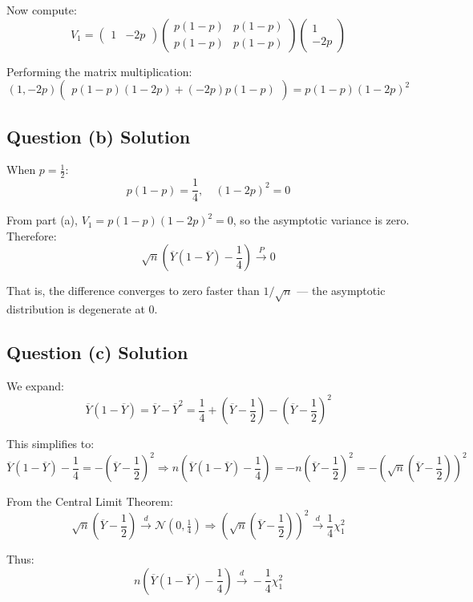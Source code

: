 \documentclass{article}
\begin{document}
Now compute:
\[
V_1 = 
\begin{pmatrix}
1 & -2p
\end{pmatrix}
\begin{pmatrix}
p(1 - p) & p(1 - p) \\
p(1 - p) & p(1 - p)
\end{pmatrix}
\begin{pmatrix}
1 \\
-2p
\end{pmatrix}
\]

Performing the matrix multiplication:
\[
(1, -2p)
\begin{pmatrix}
p(1 - p)(1 - 2p) + (-2p)p(1 - p)
\end{pmatrix}
= p(1 - p)(1 - 2p)^2
\]

\subsection{Question (b) Solution}
When $p = \frac{1}{2}$:
\[
p(1 - p) = \frac{1}{4}, \quad (1 - 2p)^2 = 0
\]

From part (a), $V_1 = p(1 - p)(1 - 2p)^2 = 0$, so the asymptotic variance is zero. Therefore:
\[
\sqrt{n} \left( \overline{Y}(1 - \overline{Y}) - \frac{1}{4} \right) \xrightarrow{P} 0
\]

That is, the difference converges to zero faster than $1/\sqrt{n}$ — the asymptotic distribution is degenerate at 0.

\subsection{Question (c) Solution}
We expand:
\[
\overline{Y}(1 - \overline{Y}) = \overline{Y} - \overline{Y}^2 = \frac{1}{4} + \left( \overline{Y} - \frac{1}{2} \right) - \left( \overline{Y} - \frac{1}{2} \right)^2
\]

This simplifies to:
\[
\overline{Y}(1 - \overline{Y}) - \frac{1}{4} = -\left( \overline{Y} - \frac{1}{2} \right)^2
\Rightarrow
n \left( \overline{Y}(1 - \overline{Y}) - \frac{1}{4} \right) = -n \left( \overline{Y} - \frac{1}{2} \right)^2 = - \left( \sqrt{n} \left( \overline{Y} - \frac{1}{2} \right) \right)^2
\]

From the Central Limit Theorem:
\[
\sqrt{n} \left( \overline{Y} - \frac{1}{2} \right) \xrightarrow{d} \mathcal{N}(0, \tfrac{1}{4})
\Rightarrow
\left( \sqrt{n} \left( \overline{Y} - \frac{1}{2} \right) \right)^2 \xrightarrow{d} \frac{1}{4} \chi^2_1
\]

Thus:
\[
n \left( \overline{Y}(1 - \overline{Y}) - \frac{1}{4} \right) \xrightarrow{d} -\frac{1}{4} \chi^2_1
\]
\end{document}
